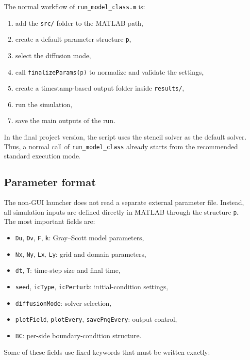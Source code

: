 The normal workflow of \texttt{run\_model\_class.m} is:

\begin{enumerate}
    \item add the \texttt{src/} folder to the MATLAB path,
    \item create a default parameter structure \texttt{p},
    \item select the diffusion mode,
    \item call \texttt{finalizeParams(p)} to normalize and validate the settings,
    \item create a timestamp-based output folder inside \texttt{results/},
    \item run the simulation,
    \item save the main outputs of the run.
\end{enumerate}

In the final project version, the script uses the stencil solver as the default solver. Thus, a normal call of \texttt{run\_model\_class} already starts from the recommended standard execution mode.

\subsection*{Parameter format}

The non-GUI launcher does not read a separate external parameter file. Instead, all simulation inputs are defined directly in MATLAB through the structure \texttt{p}. The most important fields are:

\begin{itemize}
    \item \texttt{Du}, \texttt{Dv}, \texttt{F}, \texttt{k}: Gray--Scott model parameters,
    \item \texttt{Nx}, \texttt{Ny}, \texttt{Lx}, \texttt{Ly}: grid and domain parameters,
    \item \texttt{dt}, \texttt{T}: time-step size and final time,
    \item \texttt{seed}, \texttt{icType}, \texttt{icPerturb}: initial-condition settings,
    \item \texttt{diffusionMode}: solver selection,
    \item \texttt{plotField}, \texttt{plotEvery}, \texttt{savePngEvery}: output control,
    \item \texttt{BC}: per-side boundary-condition structure.
\end{itemize}

Some of these fields use fixed keywords that must be written exactly:

